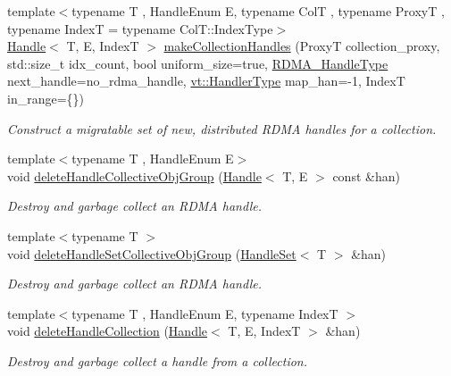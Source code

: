 \begin{DoxyCompactItemize}
{\footnotesize template$<$typename T , Handle\+Enum E, typename ColT , typename ProxyT , typename IndexT  = typename Col\+T\+::\+Index\+Type$>$ }\\\hyperlink{structvt_1_1rdma_1_1_handle}{Handle}$<$ T, E, IndexT $>$ \hyperlink{structvt_1_1rdma_1_1_manager_aad62be5c2cb0225139cf3d665b5fd7f2}{make\+Collection\+Handles} (ProxyT collection\+\_\+proxy, std\+::size\+\_\+t idx\+\_\+count, bool uniform\+\_\+size=true, \hyperlink{namespacevt_a10442579ec4e7ebef223818e64bcf908}{R\+D\+M\+A\+\_\+\+Handle\+Type} next\+\_\+handle=no\+\_\+rdma\+\_\+handle, \hyperlink{namespacevt_af64846b57dfcaf104da3ef6967917573}{vt\+::\+Handler\+Type} map\+\_\+han=-\/1, IndexT in\+\_\+range=\{\})
\begin{DoxyCompactList}\small\item\em Construct a migratable set of new, distributed R\+D\+MA handles for a collection. \end{DoxyCompactList}\item 
{\footnotesize template$<$typename T , Handle\+Enum E$>$ }\\void \hyperlink{structvt_1_1rdma_1_1_manager_a4219310feca011fd242e654c9ba51280}{delete\+Handle\+Collective\+Obj\+Group} (\hyperlink{structvt_1_1rdma_1_1_handle}{Handle}$<$ T, E $>$ const \&han)
\begin{DoxyCompactList}\small\item\em Destroy and garbage collect an R\+D\+MA handle. \end{DoxyCompactList}\item 
{\footnotesize template$<$typename T $>$ }\\void \hyperlink{structvt_1_1rdma_1_1_manager_a9b3b9bf148a8225295879481345e4af3}{delete\+Handle\+Set\+Collective\+Obj\+Group} (\hyperlink{structvt_1_1rdma_1_1_handle_set}{Handle\+Set}$<$ T $>$ \&han)
\begin{DoxyCompactList}\small\item\em Destroy and garbage collect an R\+D\+MA handle. \end{DoxyCompactList}\item 
{\footnotesize template$<$typename T , Handle\+Enum E, typename IndexT $>$ }\\void \hyperlink{structvt_1_1rdma_1_1_manager_a3a1f982e986d58e91837a2b1aa048468}{delete\+Handle\+Collection} (\hyperlink{structvt_1_1rdma_1_1_handle}{Handle}$<$ T, E, IndexT $>$ \&han)
\begin{DoxyCompactList}\small\item\em Destroy and garbage collect a handle from a collection. \end{DoxyCompactList}\item 

\end{DoxyCompactItemize}
